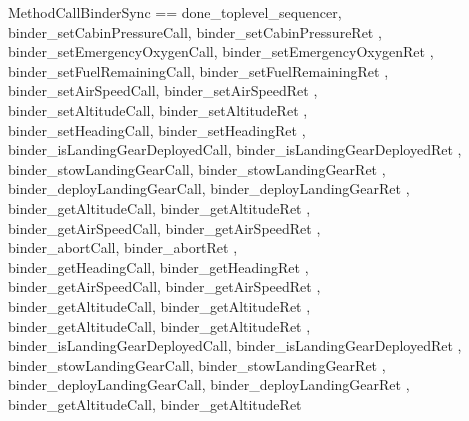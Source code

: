 \begin{circus}
\circchannelset MethodCallBinderSync == \lchanset done\_toplevel\_sequencer,
binder\_setCabinPressureCall, binder\_setCabinPressureRet
,\\
binder\_setEmergencyOxygenCall, binder\_setEmergencyOxygenRet
,\\
binder\_setFuelRemainingCall, binder\_setFuelRemainingRet
,\\
binder\_setAirSpeedCall, binder\_setAirSpeedRet
,\\
binder\_setAltitudeCall, binder\_setAltitudeRet
,\\
binder\_setHeadingCall, binder\_setHeadingRet
,\\
binder\_isLandingGearDeployedCall, binder\_isLandingGearDeployedRet
,\\
binder\_stowLandingGearCall, binder\_stowLandingGearRet
,\\
binder\_deployLandingGearCall, binder\_deployLandingGearRet
,\\
binder\_getAltitudeCall, binder\_getAltitudeRet
,\\
binder\_getAirSpeedCall, binder\_getAirSpeedRet
,\\
binder\_abortCall, binder\_abortRet
,\\
binder\_getHeadingCall, binder\_getHeadingRet
,\\
binder\_getAirSpeedCall, binder\_getAirSpeedRet
,\\
binder\_getAltitudeCall, binder\_getAltitudeRet
,\\
binder\_getAltitudeCall, binder\_getAltitudeRet
,\\
binder\_isLandingGearDeployedCall, binder\_isLandingGearDeployedRet
,\\
binder\_stowLandingGearCall, binder\_stowLandingGearRet
,\\
binder\_deployLandingGearCall, binder\_deployLandingGearRet
,\\
binder\_getAltitudeCall, binder\_getAltitudeRet

\rchanset
\end{circus}
